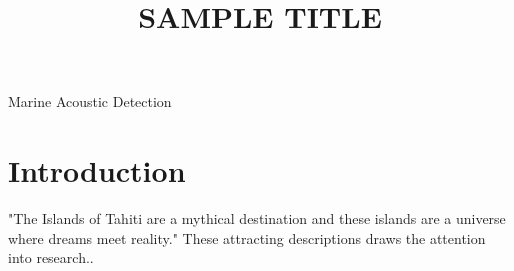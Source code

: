 \documentclass[12pt,journal,onecolumn]{IEEEtran}
\begin{document}
\title{\textbf{SAMPLE TITLE}}





{Marine Acoustic Detection} %
\maketitle



\patchcmd{\section}{\centering}{\raggedright}{}{} %
\patchcmd{\section}{\normalsize}{\large\bfseries}{}{} %

\section{Introduction}

"The Islands of Tahiti are a mythical destination and these islands are a universe where dreams meet reality." These attracting descriptions draws the attention into research.\cite{populationref}.
\end{document}
